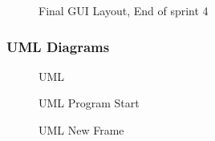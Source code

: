\documentclass[11pt]{article} %
\begin{document}
{  \begin{figure}[H]
  	\centering
  	\caption{Final GUI Layout, End of sprint 4}
  	\label{fig:GUI Design at End of Project}
  \end{figure}
  
\subsubsection{UML Diagrams}
    \begin{figure}[H]
    	\centering
    	\caption{UML }
    	\label{fig:UML2 }
    \end{figure}
    
\begin{figure}[H]
	\centering
	\caption{UML Program Start}
	\label{fig:UML2 }
\end{figure}

\begin{figure}[H]
 	\centering
 	\caption{UML New Frame}
 	\label{fig:UML2 }
\end{figure}

}
\end{document}
